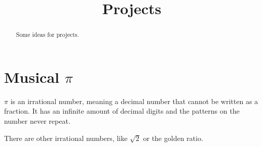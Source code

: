 \documentclass[12pt,noauthor,nooutcomes,hints,instructornotes]{ximera}%
\author{}
\title{Projects}
\begin{document}
\begin{abstract}
    Some ideas for projects.
\end{abstract}
\maketitle

\newpage
\section{Musical $\pi$}


$\pi$ is an irrational number, meaning a decimal number that cannot be written as a fraction. It has an infinite amount of decimal digits and the patterns on the number never repeat.

There are other irrational numbers, like $\sqrt{2}$ or the golden ratio.
\end{document}
